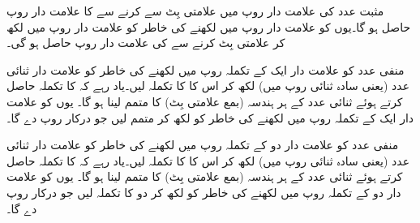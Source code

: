 	مثبت عدد  کی علامت دار روپ میں علامتی بِٹ  سے  کرنے سے  کا علامت دار روپ حاصل ہو گا۔یوں  کو علامت دار روپ میں لکھنے کی خاطر  کو علامت دار روپ  میں لکھ کر علامتی بِٹ  کرنے سے  کی علامت دار روپ  حاصل ہو گی۔
	
منفی عدد  کو علامت دار ایک کے تکملہ روپ میں لکھنے کی خاطر  کو علامت دار ثنائی عدد (یعنی سادہ ثنائی روپ میں) لکھ کر اس کا  کا تکملہ لیں۔یاد رہے کہ  کا تکملہ حاصل کرتے ہوئے ثنائی عدد کے ہر ہندسہ (بمع علامتی بِٹ) کا متمم لینا ہو گا۔ یوں  کو علامت دار ایک کے تکملہ روپ میں لکھنے کی خاطر  کو  لکھ کر متمم لیں جو درکار روپ  دے گا۔

منفی عدد  کو علامت دار دو کے تکملہ روپ میں لکھنے کی خاطر  کو علامت دار ثنائی عدد (یعنی سادہ ثنائی روپ میں) لکھ کر اس کا  کا تکملہ لیں۔یاد رہے کہ  کا تکملہ حاصل کرتے ہوئے ثنائی عدد کے ہر ہندسہ (بمع علامتی بِٹ) کا متمم لینا ہو گا۔ یوں  کو علامت دار دو کے تکملہ روپ میں لکھنے کی خاطر  کو  لکھ کر دو کا تکملہ لیں جو درکار روپ  دے گا۔

